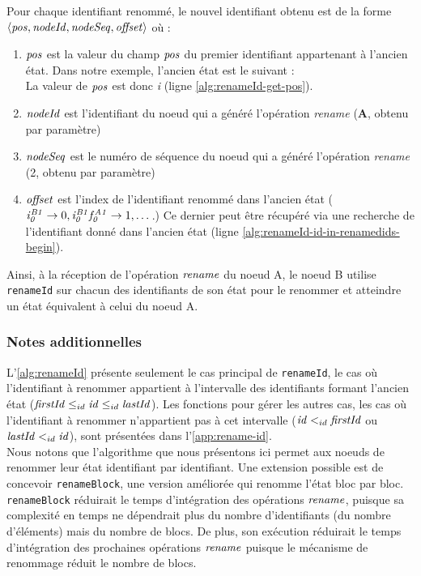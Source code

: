 Pour chaque identifiant renommé, le nouvel identifiant obtenu est de la forme $\langle \mathit{pos},\mathit{nodeId},\mathit{nodeSeq},\mathit{offset} \rangle$ où :
\begin{enumerate}
    \item $\mathit{pos}$ est la valeur du champ $\mathit{pos}$ du premier identifiant appartenant à l'ancien état.
        Dans notre exemple, l'ancien état est le suivant :
        \begin{equation*}
            [\betterid{i}{B1}{0},\betterid{i}{B1}{0}\betterid{f}{A1}{0},\betterid{i}{B1}{1},\betterid{i}{B1}{2}]
        \end{equation*}
        La valeur de $\mathit{pos}$ est donc \emph{i} (ligne \ref{alg:renameId-get-pos}).
    \item $\mathit{nodeId}$ est l'identifiant du noeud qui a généré l'opération \emph{rename} (\textbf{A}, obtenu par paramètre)
    \item $\mathit{nodeSeq}$ est le numéro de séquence du noeud qui a généré l'opération \emph{rename} (2, obtenu par paramètre)
    \item $\mathit{offset}$ est l'index de l'identifiant renommé dans l'ancien état ($\mathit{i}^{\mathit{B1}}_{\mathit{0}} \rightarrow 0,\mathit{i}^{\mathit{B1}}_{\mathit{0}}\mathit{f}^{\mathit{A1}}_{\mathit{0}} \rightarrow 1, \dots$.)
    Ce dernier peut être récupéré via une recherche de l'identifiant donné dans l'ancien état (ligne \ref{alg:renameId-id-in-renamedids-begin}).
\end{enumerate}

Ainsi, à la réception de l'opération $\mathit{rename}$ du noeud A, le noeud B utilise \texttt{renameId} sur chacun des identifiants de son état pour le renommer et atteindre un état équivalent à celui du noeud A.\\

\subsubsection{Notes additionnelles}

L'\autoref{alg:renameId} présente seulement le cas principal de \texttt{renameId}, \ie le cas où l'identifiant à renommer appartient à l'intervalle des identifiants formant l'ancien état ($\mathit{firstId} \leq_{id} \mathit{id} \leq_{id} \mathit{lastId}$).
Les fonctions pour gérer les autres cas, \ie les cas où l'identifiant à renommer n'appartient pas à cet intervalle ($\mathit{id} <_{id} \mathit{firstId}$ ou $\mathit{lastId} <_{id} \mathit{id}$), sont présentées dans l'\autoref{app:rename-id}.\\

Nous notons que l'algorithme que nous présentons ici permet aux noeuds de renommer leur état identifiant par identifiant.
Une extension possible est de concevoir \texttt{renameBlock}, une version améliorée qui renomme l'état bloc par bloc.
\texttt{renameBlock} réduirait le temps d'intégration des opérations $\mathit{rename}$, puisque sa complexité en temps ne dépendrait plus du nombre d'identifiants (\ie du nombre d'éléments) mais du nombre de blocs.
De plus, son exécution réduirait le temps d'intégration des prochaines opérations $\mathit{rename}$ puisque le mécanisme de renommage réduit le nombre de blocs.

